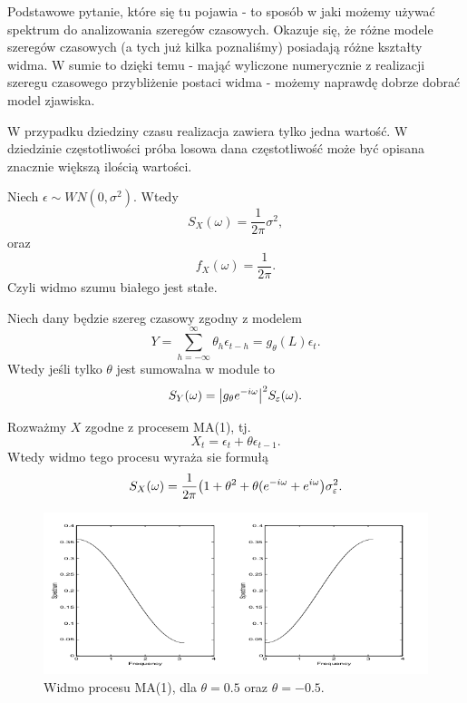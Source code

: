 \documentclass[10pt,a4paper]{book}
\begin{document}
Podstawowe pytanie, które się tu pojawia - to sposób w jaki możemy używać spektrum do analizowania szeregów czasowych. Okazuje się, że różne modele szeregów czasowych (a tych już kilka poznaliśmy) posiadają różne kształty widma. W sumie to dzięki temu - mająć wyliczone numerycznie z realizacji szeregu czasowego przybliżenie postaci widma - możemy naprawdę dobrze dobrać model zjawiska.

\begin{remark*}
W przypadku dziedziny czasu realizacja zawiera tylko jedna wartość. W dziedzinie częstotliwości próba losowa dana częstotliwość może być opisana znacznie większą ilością wartości.
\end{remark*} 

\begin{theorem}
Niech $\epsilon \sim WN(0,\sigma^2)$. Wtedy 
$$
S_X (\omega) = \frac{1}{2\pi} \sigma^2,
$$
oraz 
$$
f_X (\omega) = \frac{1}{2\pi}.
$$
Czyli widmo szumu białego jest stałe.
\end{theorem}

\begin{theorem}
Niech dany będzie szereg czasowy zgodny z modelem 
$$
Y = \sum_{h=-\infty}^{\infty} \theta_h \epsilon_{t-h} = g_{\theta} (L) \epsilon_t.
$$
Wtedy jeśli tylko $\theta$ jest sumowalna w module to 
$$
S_{Y} (\omega) = {\left| {g_{\theta} e^{-i \omega}} \right|}^2 S_\varepsilon(\omega).
$$
\end{theorem}

\begin{theorem}
Rozważmy $X$ zgodne z procesem MA(1), tj.
$$
X_t = \epsilon_t + \theta \epsilon_{t-1}.
$$
Wtedy widmo tego procesu wyraża sie formułą
$$
S_X(\omega) = \frac{1}{2\pi} {\left( {1 + \theta^2 + \theta (e^{-i \omega} + e^{i \omega}} \right)} \sigma_\varepsilon^2.
$$
\end{theorem}

\begin{figure}
\centering
\includegraphics[scale=0.6]{images/spectrumMA1.png}
\caption{Widmo procesu MA(1), dla $\theta = 0.5$ oraz $\theta= -0.5$.} \label{fig-spectrum-ma1}
\end{figure}
\end{document}
